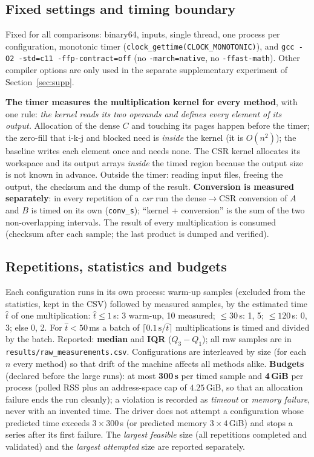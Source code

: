 \subsection{Fixed settings and timing boundary}
\label{sec:timer}
Fixed for all comparisons: binary64, inputs, single thread, one process per configuration, monotonic timer (\texttt{clock\_gettime(CLOCK\_MONOTONIC)}),
and \texttt{gcc -O2 -std=c11 -ffp-contract=off} (no \texttt{-march=native}, no \texttt{-ffast-math}). Other compiler options are only used in the separate
supplementary experiment of Section~\ref{sec:supp}.

\textbf{The timer measures the multiplication kernel for every method}, with one rule: \emph{the kernel reads its two operands and defines every element of its output.}
Allocation of the dense $C$ and touching its pages happen before the timer; the zero-fill that i-k-j and blocked need is \emph{inside} the kernel (it is $O(n^2)$);
the baseline writes each element once and needs none. The CSR kernel allocates its workspace and its output arrays \emph{inside} the timed region because the output
size is not known in advance. Outside the timer: reading input files, freeing the output, the checksum and the dump of the result.
\textbf{Conversion is measured separately}: in every repetition of a \emph{csr} run the dense$\to$CSR conversion of $A$ and $B$ is timed on its own
(\texttt{conv\_s}); ``kernel + conversion'' is the sum of the two non-overlapping intervals. The result of every multiplication is consumed (checksum after each sample; the last product is dumped and verified).

\subsection{Repetitions, statistics and budgets}
Each configuration runs in its own process: warm-up samples (excluded from the statistics, kept in the CSV) followed by measured samples, by the estimated
time $\hat t$ of one multiplication: $\hat t\le1$\,s: 3 warm-up, 10 measured; $\le30$\,s: 1, 5; $\le120$\,s: 0, 3; else 0, 2. For $\hat t<50$\,ms a batch of
$\lceil0.1\,\text{s}/\hat t\rceil$ multiplications is timed and divided by the batch. Reported: \textbf{median} and \textbf{IQR} ($Q_3-Q_1$); all raw samples are in
\texttt{results/raw\_measurements.csv}. Configurations are interleaved by size (for each $n$ every method) so that drift of the machine affects all methods alike.
\textbf{Budgets} (declared before the large runs): at most \textbf{300\,s} per timed sample and \textbf{4\,GiB} per process (polled RSS plus an address-space cap of
$4.25$\,GiB, so that an allocation failure ends the run cleanly); a violation is recorded as \emph{timeout} or \emph{memory failure}, never with an invented time. The driver does not
attempt a configuration whose predicted time exceeds $3\times300$\,s (or predicted memory $3\times4$\,GiB) and stops a series after its first failure. The \emph{largest feasible} size
(all repetitions completed and validated) and the \emph{largest attempted} size are reported separately.


